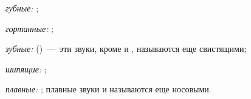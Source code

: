 \documentclass[11pt,a4paper,oneside]{memoir}
\begin{document}
    \emph{губные:} {\slv{}};
    
    \emph{гортанные:} {\slv{}};
    
    \emph{зубные:} {} ({}){}~---~эти звуки, кроме {} и {}, называются еще свистящими;
    
    \emph{шипящие:} {\slv{}};
    
    \emph{плавные:} {\slv{}}; плавные звуки {\slv{}} и {\slv{}} называются еще носовыми.
    
    
    
    
    

\end{document}
